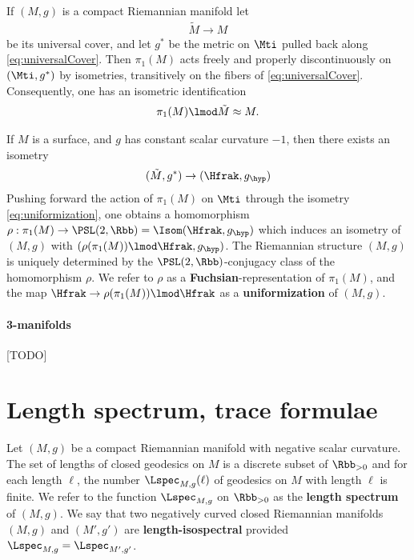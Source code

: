 
If $(M,g)$ is a compact Riemannian manifold let
\begin{align}\label{eq:universalCover}
    \tilde{M} \to M
\end{align}
be its universal cover, and let $g^*$ be the metric on $\Mti$ pulled back along \ref{eq:universalCover}. Then $\pi_1(M)$ acts freely and properly discontinuously on $(\Mti,g^*)$ by isometries, transitively on the fibers of \ref{eq:universalCover}. Consequently, one has an isometric identification
\begin{align}
    \pi_1(M) \lmod \tilde{M} \approx M.
\end{align}

If $M$ is a surface, and $g$ has constant scalar curvature $-1$, then there exists an isometry
\begin{align}\label{eq:uniformization}
    (\tilde{M},g^*) \to (\Hfrak , g_\hyp)
\end{align}
Pushing forward the action of $\pi_1(M)$ on $\Mti$ through the isometry \ref{eq:uniformization}, one obtains a homomorphism $\rho: \pi_1(M) \to \PSL(2,\Rbb) =\Isom(\Hfrak,g_\hyp)$ which induces an isometry of $(M,g)$ with $(\rho(\pi_1(M))\lmod \Hfrak,g_\hyp)$. The Riemannian structure  $(M,g)$ is uniquely determined by the $\PSL(2,\Rbb)$-conjugacy class of the homomorphism $\rho$. We refer to $\rho$ as a \textbf{Fuchsian}-representation of $\pi_1(M)$, and the map $\Hfrak \to \rho(\pi_1(M)) \lmod \Hfrak$ as a \textbf{uniformization} of $(M,g)$.




\paragraph{3-manifolds}
[TODO]
\section{Length spectrum, trace formulae}

Let $(M,g)$ be a compact Riemannian manifold with negative scalar curvature. The set of lengths of closed geodesics on $M$ is a discrete subset of $\Rbb_{>0}$ and for each length $\ell$, the number $\Lspec_{M,g}(\ell)$ of geodesics on $M$ with length $\ell$ is finite. We refer to the function $\Lspec_{M,g}$ on $\Rbb_{>0}$ as the \textbf{length spectrum} of $(M,g)$.  We say that two negatively curved closed Riemannian manifolds $(M,g)$ and $(M',g')$  are \textbf{length-isospectral} provided $\Lspec_{M,g} = \Lspec_{M',g'}$.


